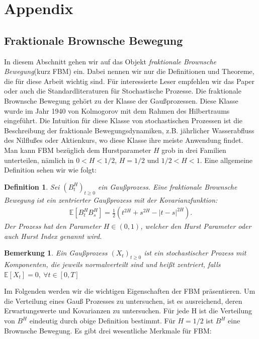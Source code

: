 \documentclass[12pt,titlepage,headsepline]{article}
\newtheorem{definition}{Definition}[section]
\newtheorem*{bemerkung*}{Bemerkung}
\begin{document}
    \section{Appendix}

      \subsection{Fraktionale Brownsche Bewegung}\label{appendix:fbm}
      In diesem Abschnitt gehen wir auf das Objekt \textit{fraktionale Brownsche Bewegung}(kurz FBM) ein. Dabei nennen wir nur die Definitionen und Theoreme, die für diese Arbeit wichtig sind. Für interessierte Leser empfehlen wir das Paper \cite{shevchenko_fractional_2014} oder auch die Standardliteraturen für Stochastische Prozesse.
      Die fraktionale Brownsche Bewegung gehört zu der Klasse der Gaußprozessen. Diese Klasse wurde im Jahr 1940 von Kolmogorov mit dem Rahmen des Hilbertraums eingeführt. Die Intuition für diese Klasse von stochastischen Prozessen ist die Beschreibung der fraktionale Bewegungsdynamiken, z.B. jährlicher Wasserabfluss des Nilflußes oder Aktienkurs, wo diese Klasse ihre meiste Anwendung findet. Man kann FBM bezüglich dem Hurstparameter $H$ grob in drei Familien unterteilen, nämlich in $0<H<1/2$, $H=1/2$ und $1/2<H<1$. Eine allgemeine Definition sehen wir wie folgt:
      \begin{definition}
        Sei $(B_t^H)_{t \geq 0}$ ein Gaußprozess. Eine fraktionale Brownsche Bewegung ist ein zentrierter Gaußprozess mit der Kovarianzfunktion:
        \begin{align*}
          \mathbb{E}[B_t^HB_s^H]=\frac{1}{2}(t^{2H}+s^{2H}-{\lvert t-s \rvert}^{2H}).
        \end{align*}
        Der Prozess hat den Parameter $H \in (0,1) $, welcher den Hurst Parameter oder auch Hurst Index genannt wird.
      \end{definition}
      \begin{bemerkung*}
        \textup{
        Ein Gaußprozess $(X_t)_{t \geq 0}$ ist ein stochastischer Prozess mit Komponenten, die jeweils normalverteilt sind und heißt zentriert, falls $\mathbb{E}[X_t]=0, \ \forall t \in [0,T]$
        }
      \end{bemerkung*}
      Im Folgenden werden wir die wichtigen Eigenschaften der FBM präsentieren. Um die Verteilung eines Gauß Prozesses zu untersuchen, ist es ausreichend, deren Erwartungswerte und Kovarianzen zu untersuchen. Für jede H ist die Verteilung von $B^H$ eindeutig durch obige Definition bestimmt. Für $H = 1/2$ ist $B^H$ eine Brownsche Bewegung. Es gibt drei wesentliche Merkmale für FBM:
\end{document}

